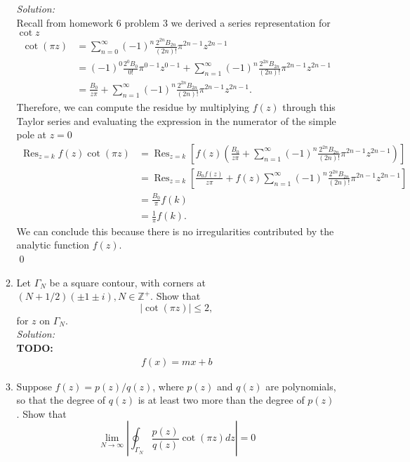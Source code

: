\documentclass[10pt]{amsart}
\theoremstyle{nonumberplain}
\begin{document}
\begin{enumerate}[label={\bf {\arabic*}:}]
\begin{enumerate}
\noindent
\textit{Solution:} \\
Recall from homework 6 problem 3 we derived a series representation for $\cot z$
\begin{align*}
\cot(\pi z) &= \sum_{n = 0}^\infty (-1)^n \frac {2^{2n}B_{2n}}{(2n)!} \pi^{2n - 1} z^{2n - 1} \\
	&= (-1)^0 \frac {2^{0}B_{0}}{0!} \pi^{0 - 1} z^{0 - 1} + \sum_{n = 1}^\infty (-1)^n \frac {2^{2n}B_{2n}}{(2n)!} \pi^{2n - 1} z^{2n - 1} \\
	&= \frac {B_0} {z\pi} + \sum_{n = 1}^\infty (-1)^n \frac {2^{2n}B_{2n}}{(2n)!} \pi^{2n - 1} z^{2n - 1}.
\end{align*}
Therefore, we can compute the residue by multiplying $f(z)$ through this Taylor series and evaluating the expression in the numerator of the simple pole at $z = 0$
\begin{align*}
\operatorname{Res}_{z=k} f(z) \cot (\pi z)
	&= \operatorname{Res}_{z=k} \left[ f(z) \left( \frac {B_0} {z\pi} + \sum_{n = 1}^\infty (-1)^n \frac {2^{2n}B_{2n}}{(2n)!} \pi^{2n - 1} z^{2n - 1}\right) \right] \\
	&= \operatorname{Res}_{z=k} \left[  \frac {B_0 f(z)} {z\pi} + f(z)\sum_{n = 1}^\infty (-1)^n \frac {2^{2n}B_{2n}}{(2n)!} \pi^{2n - 1} z^{2n - 1} \right] \\
	&= \frac{B_0}{\pi} f(k) \\
	&= \frac 1 {\pi} f(k).
\end{align*}
We can conclude this because there is no irregularities contributed by the analytic function $f(z)$. \\
\qed \\

\item Let $\Gamma_N$ be a square contour, with corners at $(N+1 / 2)( \pm 1 \pm i), N \in \mathbb{Z}^{+}$. Show that
$$
|\cot (\pi z)| \leq 2,
$$
for $z$ on $\Gamma_N$.\\
 
\noindent
\textit{Solution:} \\
\textbf{TODO:}
\begin{align*}
f(x) = mx + b
\end{align*}


\item Suppose $f(z)=p(z) / q(z)$, where $p(z)$ and $q(z)$ are polynomials, so that the degree of $q(z)$ is at least two more than the degree of $p(z)$. Show that
$$
\lim _{N \rightarrow \infty}\left|\oint_{\Gamma_N} \frac{p(z)}{q(z)} \cot (\pi z) d z\right|=0
$$
 

\end{enumerate}
\end{enumerate}
\end{document}
